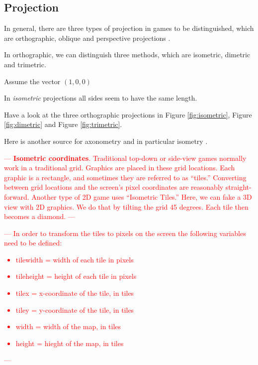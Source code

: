 \subsection{Projection} \label{subsection: projection}
In general, there are three types of projection in games to be distinguished, which are orthographic, oblique and perspective projections \cite{salomon2007transformations}.

In orthographic, we can distinguish three methods, which are isometric, dimetric and trimetric.


Assume the vector $(1, 0, 0)$

% 






In \textit{isometric} projections all sides seem to have the same length. 


Have a look at the three orthographic projections in Figure \ref{fig:isometric}, Figure \ref{fig:dimetric} and Figure \ref{fig:trimetric}.

Here is another source for axonometry and in particular isometry \cite{krikke2000axonometry}.



\textcolor{red}{---
\textbf{Isometric coordinates}.
Traditional top-down or side-view games normally work in a traditional grid. Graphics are placed in these grid locations. 
Each graphic is a rectangle, and sometimes they are referred to as “tiles.”
Converting between grid locations and the screen’s pixel coordinates are reasonably straight-forward.
Another type of 2D game uses “Isometric Tiles.” 
Here, we can fake a 3D view with 2D graphics. We do that by tilting the grid 45 degrees. 
Each tile then becomes a diamond.
---}

\textcolor{red}{---
In order to transform the tiles to pixels on the screen the following variables need to be defined:
\begin{itemize}
    \item tilewidth = width of each tile in pixels
    \item tileheight = height of each tile in pixels
    \item tilex = x-coordinate of the tile, in tiles
    \item tiley = y-coordinate of the tile, in tiles
    \item width = width of the map, in tiles
    \item height = hieght of the map, in tiles
\end{itemize}
---}


